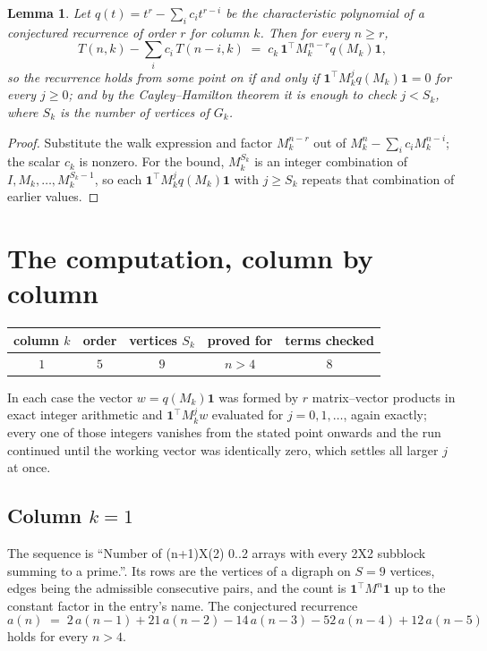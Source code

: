 \documentclass[11pt,a4paper]{article}
\theoremstyle{plain}
\newtheorem{lemma}[theorem]{Lemma}
\theoremstyle{definition}
\begin{document}
\begin{lemma}\label{lem:crit}
Let $q(t)=t^{r}-\sum_i c_it^{r-i}$ be the characteristic polynomial of a conjectured
recurrence of order $r$ for column $k$. Then for every $n\ge r$,
\[
T(n,k)-\sum_i c_i\,T(n-i,k)\;=\;c_k\,\mathbf{1}^{\!\top}M_k^{\,n-r}q(M_k)\mathbf{1},
\]
so the recurrence holds from some point on if and only if
$\mathbf{1}^{\!\top}M_k^{j}q(M_k)\mathbf{1}=0$ for every $j\ge0$; and by the
Cayley--Hamilton theorem it is enough to check $j<S_k$, where $S_k$ is the number of vertices
of $G_k$.
\end{lemma}

\begin{proof}
Substitute the walk expression and factor $M_k^{n-r}$ out of $M_k^{n}-\sum_ic_iM_k^{n-i}$;
the scalar $c_k$ is nonzero. For the bound, $M_k^{S_k}$ is an integer combination of
$I,M_k,\dots,M_k^{S_k-1}$, so each $\mathbf{1}^{\!\top}M_k^{j}q(M_k)\mathbf{1}$ with
$j\ge S_k$ repeats that combination of earlier values.
\end{proof}

\section{The computation, column by column}

\begin{center}
\begin{tabular}{ccccc}
column $k$ & order & vertices $S_k$ & proved for & terms checked \\ \hline
$1$ & $5$ & $9$ & $n>4$ & $8$ \\
\end{tabular}
\end{center}

In each case the vector $w=q(M_k)\mathbf{1}$ was formed by $r$ matrix--vector products in
exact integer arithmetic and $\mathbf{1}^{\!\top}M_k^{j}w$ evaluated for $j=0,1,\dots$,
again exactly; every one of those integers vanishes from the stated point onwards and the run
continued until the working vector was identically zero, which settles all larger $j$ at once.

\subsection*{Column $k=1$}
The sequence is ``Number of (n+1)X(2) 0..2 arrays with every 2X2 subblock summing to a prime.''. Its rows are the vertices of a digraph on
$S=9$ vertices, edges being the admissible consecutive pairs, and the count is
$\mathbf{1}^{\!\top}M^{n}\mathbf{1}$ up to the constant factor in the entry's name.
The conjectured recurrence
\[
a(n)\;=\;2\,a(n-1) + 21\,a(n-2) - 14\,a(n-3) - 52\,a(n-4) + 12\,a(n-5)
\]
holds for every $n>4$.
\end{document}
